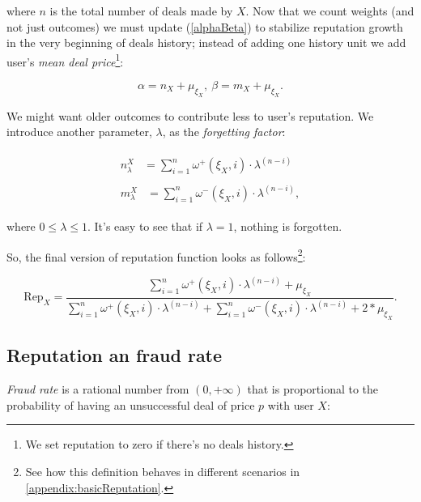 \documentclass[11pt]{article}
\begin{document}
where $ n $ is the total number of deals made by $ X $. Now that we count weights (and not just outcomes) we must update (\ref{alphaBeta}) to stabilize reputation growth in the very beginning of deals history; instead of adding one history unit we add user's \textit{mean deal price}\footnote{We set reputation to zero if there's no deals history.}:

\begin{equation} \label{alphaBeta}
\alpha = n_{X} + \mu_{\xi_X},\ \beta = m_{X} + \mu_{\xi_X}.
\end{equation}

We might want older outcomes to contribute less to user's reputation. We introduce another parameter, $ \lambda $, as the \textit{forgetting factor}:

\begin{align}
\begin{split}
n_{\lambda}^{X} {}& = \sum_{i = 1}^{n} \omega^{+}(\xi_X, i) \cdot \lambda^{(n - i)}
\end{split} \\
\begin{split}
m_{\lambda}^{X} {}& = \sum_{i = 1}^{n} \omega^{-}(\xi_X, i) \cdot \lambda^{(n - i)},
\end{split}
\end{align}

where $ 0 \leq \lambda \leq 1 $. It's easy to see that if $ \lambda = 1 $, nothing is forgotten.

So, the final version of reputation function looks as follows\footnote{See how this definition behaves in different scenarios in \ref{appendix:basicReputation}.}:

\begin{equation} \label{reputationFunction}
\text{Rep}_{X} = \frac{\sum_{i = 1}^{n} \omega^{+}(\xi_X, i) \cdot \lambda^{(n - i)} + \mu_{\xi_X}}{\sum_{i = 1}^{n} \omega^{+}(\xi_X, i) \cdot \lambda^{(n - i)} + \sum_{i = 1}^{n} \omega^{-}(\xi_X, i) \cdot \lambda^{(n - i)} + 2 * \mu_{\xi_X}}.
\end{equation}

\bigskip

\subsection{Reputation an fraud rate} \label{reputation:fraudRate}

\textit{Fraud rate} is a rational number from $ (0, +\infty) $ that is proportional to the probability of having an unsuccessful deal of price $ p $ with user $ X $:
\end{document}
